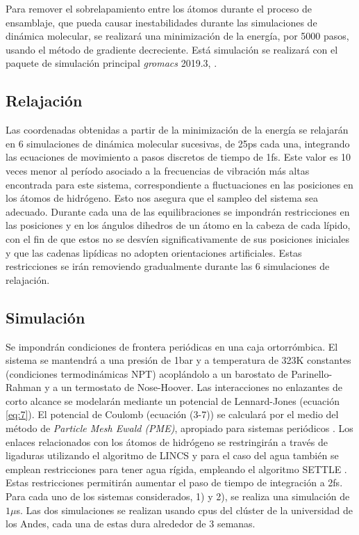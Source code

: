 Para remover el sobrelapamiento entre los \'{a}tomos durante el proceso de ensamblaje, que pueda causar inestabilidades durante las simulaciones de din\'{a}mica molecular, se realizar\'{a} una minimizaci\'{o}n de la energ\'{i}a, por 5000 pasos, usando el m\'{e}todo de gradiente decreciente. Est\'{a} simulaci\'{o}n se realizar\'{a} con el paquete de simulaci\'{o}n principal \textit{gromacs} 2019.3, \cite{Abraham2015Gromacs:Supercomputers}.


\subsection*{Relajaci\'{o}n}

Las coordenadas obtenidas a partir de la minimizaci\'{o}n de la energ\'{i}a se relajar\'{a}n en 6 simulaciones de din\'{a}mica molecular sucesivas, de 25ps cada una, integrando las ecuaciones de movimiento a pasos discretos de tiempo de 1fs. Este valor es 10 veces menor al per\'{i}odo asociado a la frecuencias de vibraci\'{o}n m\'{a}s altas encontrada para este sistema, correspondiente a fluctuaciones en las posiciones en los \'{a}tomos de hidr\'{o}geno. Esto nos asegura que el sampleo del sistema sea adecuado. Durante cada una de las equilibraciones se impondr\'{a}n restricciones en las posiciones y en los \'{a}ngulos dihedros de un \'{a}tomo en la cabeza de cada l\'{i}pido, con el fin de que estos no se desv\'{i}en significativamente de sus posiciones iniciales y que las cadenas lip\'{i}dicas no adopten orientaciones artificiales. Estas restricciones se ir\'{a}n removiendo gradualmente durante las 6 simulaciones de relajaci\'{o}n.\\

\subsection*{Simulaci\'{o}n}

Se impondr\'{a}n condiciones de frontera peri\'{o}dicas en una caja ortorr\'{o}mbica. El sistema se mantendr\'{a} a una presi\'{o}n de 1bar y a temperatura de 323K constantes (condiciones termodin\'{a}micas NPT) acopl\'{a}ndolo a un barostato de Parinello-Rahman \cite{Parrinello1981PolymorphicMethod} y a un termostato de Nose-Hoover. Las interacciones no enlazantes de corto alcance se modelar\'{a}n mediante un potencial de Lennard-Jones (ecuaci\'{o}n \eqref{eq:7}). El potencial de Coulomb (ecuaci\'{o}n (3-7)) se calcular\'{a} por el medio del m\'{e}todo de \textit{Particle Mesh Ewald (PME)}, apropiado para sistemas peri\'{o}dicos \cite{Darden1993ParticleSystems}. Los enlaces relacionados con los \'{a}tomos de hidr\'{o}geno  se restringir\'{a}n a trav\'{e}s de ligaduras utilizando el algoritmo de LINCS \cite{Hess1997LINCS:Simulations} y para el caso del agua tambi\'{e}n se emplean restricciones para tener agua r\'{i}gida, empleando el algoritmo SETTLE \cite{Miyamoto1992Settle:Models}. Estas restricciones permitir\'{a}n aumentar el paso de tiempo de integraci\'{o}n a 2fs. Para cada uno de los sistemas considerados, 1) y 2), se realiza una simulaci\'{o}n de $1\mu$s. Las dos simulaciones se realizan usando cpus del cl\'{u}ster de la universidad de los Andes, cada una de estas dura alrededor de 3 semanas.\\

